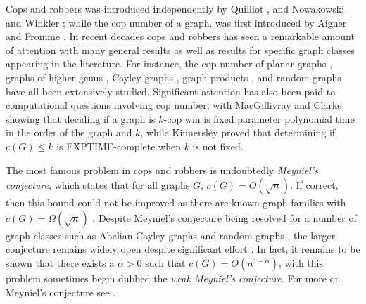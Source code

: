 \documentclass{amsart}
\theoremstyle{definition}
\begin{document}
Cops and robbers was introduced independently by Quilliot \cite{quilliot1983problemes}, and Nowakowski and Winkler \cite{nowakowski1983vertex}; while the cop number of a graph, was first introduced by Aigner and Fromme \cite{aigner1984game}. In recent decades cops and robbers has seen a remarkable amount of attention with many general results as well as results for specific graph classes appearing in the literature. For instance, the cop number of planar graphs \cite{aigner1984game}, graphs of higher genus \cite{bonato2020topological, bowler2019bounding, quilliot1985short, schroder2001copnumber}, Cayley graphs \cite{bradshaw2020proof,frankl1987cops}, graph products \cite{neufeld1998game}, and random graphs \cite{bollobas2013cops,luczak2010chasing, pralat2016meyniel} have all been extensively studied. Significant attention has also been paid to computational questions involving cop number, with MacGillivray and Clarke \cite{clarke2012characterizations} showing that deciding if a graph is $k$-cop win is fixed parameter polynomial time in the order of the graph and $k$, while Kinnersley \cite{kinnersley2015cops} proved that determining if $c(G) \leq k$ is EXPTIME-complete when $k$ is not fixed.

The most famous problem in cops and robbers is undoubtedly \emph{Meyniel's conjecture}, which states that for all graphs $G$, $c(G) = O(\sqrt{n})$. If correct, then this bound could not be improved as there are known graph families with $c(G) = \Omega(\sqrt{n})$ \cite{bonato2013cops, pralat2010does}. Despite Meyniel's conjecture being resolved for a number of graph classes such as Abelian Cayley graphs \cite{bradshaw2020proof} and random graphs \cite{bollobas2013cops, pralat2016meyniel}, the larger conjecture remains widely open despite significant effort \cite{chiniforooshan2008better,frieze2012variations, lu2012meyniel, scott2011bound}. In fact, it remains to be shown that there exists a $\alpha>0$ such that $c(G) = O(n^{1-\alpha})$, with this problem sometimes begin dubbed the \emph{weak Meyniel's conjecture}. For more on Meyniel's conjecture see \cite{baird2013meyniel}.
\end{document}

